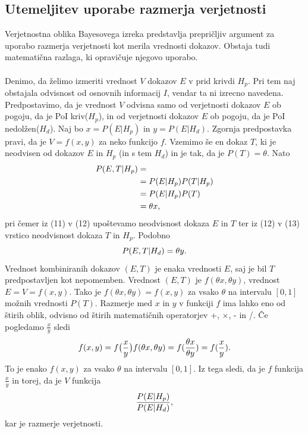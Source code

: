 \documentclass[12pt,a4paper]{amsart}
\theoremstyle{definition} %
\theoremstyle{plain} %
\begin{document}
\subsection{Utemeljitev uporabe razmerja verjetnosti}
Verjetnostna oblika Bayesovega izreka predstavlja prepričljiv argument za uporabo razmerja verjetnosti kot merila vrednosti dokazov.
Obstaja tudi matematična razlaga, ki opravičuje njegovo uporabo.\\\\
Denimo, da želimo izmeriti vrednost $V$ dokazov $E$ v prid krivdi $H_p$. Pri tem naj obstajala odvisnost od osnovnih informacij $I$, vendar ta ni izrecno
navedena. Predpostavimo, da je vrednost $V$ odvisna samo od verjetnosti dokazov $E$ ob pogoju, da je PoI kriv($H_p$), in od verjetnosti dokazov $E$ ob pogoju,
da je PoI nedolžen($H_d$). Naj bo $x=P(E \lvert H_p)$ in $y=P(E \lvert H_d)$. Zgornja predpostavka pravi, da je $V = f (x, y)$ za neko funkcijo $f$.
Vzemimo še en dokaz $T$, ki je neodvisen od dokazov $E$ in $H_p$ (in s tem $H_d$) in je tak, da je $P(T) = \theta$. Nato
\begin{align}
   P(E,T \lvert H_p) & = \\
   & = P(E \lvert H_p)P(T \lvert H_p) \\
   & = P(E \lvert H_p)P(T)\\
   & = \theta x, \vspace{2mm}
\end{align}
pri čemer iz (11) v (12) upoštevamo neodvisnost dokaza $E$ in $T$ ter iz (12) v (13) vrstico neodvisnost dokaza $T$ in $H_p$. Podobno
\[
   P(E,T \lvert H_d)  = \theta y. \vspace{2mm}
\]
Vrednost kombiniranih dokazov $(E, T)$ je enaka vrednosti $E$, saj je bil $T$ predpostavljen kot nepomemben. Vrednost $(E, T)$ je $f(\theta x, \theta y)$,
vrednost $E = V = f (x, y)$. Tako je $f(\theta x, \theta y) = f(x,y)$ za vsako $\theta$ na intervalu $[0,1]$ možnih vrednosti $P(T)$. Razmerje med
$x$ in $y$ v funkciji $f$ ima lahko eno od štirih oblik, odvisno od štirih matematičnih operatorjev +, ×, - in /. Če pogledamo $\frac{x}{y}$ sledi
\[
   f(x,y) = f \big(\frac{x}{y}\big)
   f(\theta x, \theta y) = f(\frac{\theta x}{\theta y}) = f(\frac{x}{y}). \vspace{2mm}
\]
To je enako $f(x,y)$ za vsako $\theta$ na intervalu $[0,1]$. Iz tega sledi, da je $f$ funkcija $\frac{x}{y}$ in torej, da je $V$ funkcija
\[
   \frac{P(E \lvert H_p)}{P(E \lvert H_d)}, \vspace{2mm}
\]
kar je razmerje verjetnosti.\\\\
\end{document}
